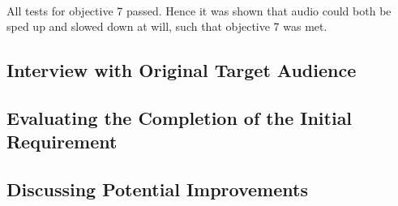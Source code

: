 \paragraph{}
All tests for objective 7 passed. Hence it was shown that audio could both be sped up and slowed down at will, such that objective 7 was met.

\pagebreak
\subsection{Interview with Original Target Audience}

\pagebreak
\subsection{Evaluating the Completion of the Initial Requirement}

\pagebreak
\subsection{Discussing Potential Improvements}